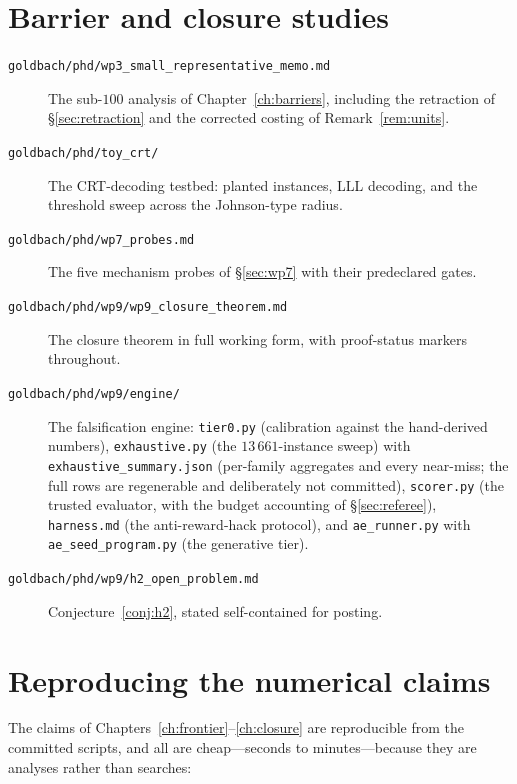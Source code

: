 \section{Barrier and closure studies}

\begin{description}
\item[\texttt{goldbach/phd/wp3\_small\_representative\_memo.md}] The sub-$100$
analysis of Chapter~\ref{ch:barriers}, including the retraction of
\S\ref{sec:retraction} and the corrected costing of Remark~\ref{rem:units}.
\item[\texttt{goldbach/phd/toy\_crt/}] The CRT-decoding testbed: planted
instances, LLL decoding, and the threshold sweep across the Johnson-type radius.
\item[\texttt{goldbach/phd/wp7\_probes.md}] The five mechanism probes of
\S\ref{sec:wp7} with their predeclared gates.
\item[\texttt{goldbach/phd/wp9/wp9\_closure\_theorem.md}] The closure theorem in
full working form, with proof-status markers throughout.
\item[\texttt{goldbach/phd/wp9/engine/}] The falsification engine:
\texttt{tier0.py} (calibration against the hand-derived numbers),
\texttt{exhaustive.py} (the $13\,661$-instance sweep) with
\texttt{exhaustive\_summary.json} (per-family aggregates and every near-miss;
the full rows are regenerable and deliberately not committed),
\texttt{scorer.py} (the trusted evaluator, with the budget accounting of
\S\ref{sec:referee}), \texttt{harness.md} (the anti-reward-hack protocol), and
\texttt{ae\_runner.py} with \texttt{ae\_seed\_program.py} (the generative tier).
\item[\texttt{goldbach/phd/wp9/h2\_open\_problem.md}] Conjecture~\ref{conj:h2},
stated self-contained for posting.
\end{description}

\section{Reproducing the numerical claims}

The claims of Chapters~\ref{ch:frontier}--\ref{ch:closure} are reproducible from
the committed scripts, and all are cheap---seconds to minutes---because they are
analyses rather than searches:


